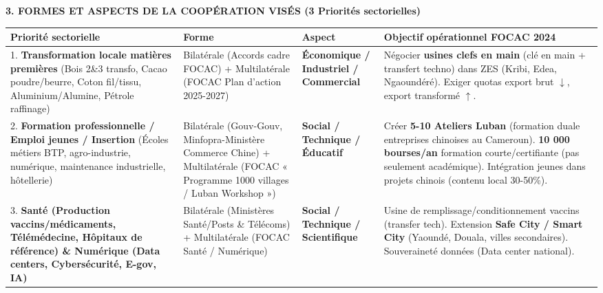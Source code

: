 \documentclass[11pt]{article}
\begin{document}
\begin{corrige}
\vspace{0.3cm}
\noindent\textbf{3. FORMES ET ASPECTS DE LA COOPÉRATION VISÉS (3 Priorités sectorielles)}

\begin{center}
\begin{tabularx}{\linewidth}{|l|X|X|X|}\hline
\textbf{Priorité sectorielle} & \textbf{Forme} & \textbf{Aspect} & \textbf{Objectif opérationnel FOCAC 2024} \\ \hline
1. \textbf{Transformation locale matières premières} (Bois 2\&3 transfo, Cacao poudre/beurre, Coton fil/tissu, Aluminium/Alumine, Pétrole raffinage) & Bilatérale (Accords cadre FOCAC) + Multilatérale (FOCAC Plan d'action 2025-2027) & \textbf{Économique / Industriel / Commercial} & Négocier \textbf{usines clefs en main} (clé en main + transfert techno) dans ZES (Kribi, Edea, Ngaoundéré). Exiger quotas export brut $\downarrow$, export transformé $\uparrow$. \\ \hline
2. \textbf{Formation professionnelle / Emploi jeunes / Insertion} (Écoles métiers BTP, agro-industrie, numérique, maintenance industrielle, hôtellerie) & Bilatérale (Gouv-Gouv, Minfopra-Ministère Commerce Chine) + Multilatérale (FOCAC « Programme 1000 villages / Luban Workshop ») & \textbf{Social / Technique / Éducatif} & Créer \textbf{5-10 Ateliers Luban} (formation duale entreprises chinoises au Cameroun). \textbf{10 000 bourses/an} formation courte/certifiante (pas seulement académique). Intégration jeunes dans projets chinois (contenu local 30-50\%). \\ \hline
3. \textbf{Santé (Production vaccins/médicaments, Télémédecine, Hôpitaux de référence) \& Numérique (Data centers, Cybersécurité, E-gov, IA)} & Bilatérale (Ministères Santé/Posts \& Télécoms) + Multilatérale (FOCAC Santé / Numérique) & \textbf{Social / Technique / Scientifique} & Usine de remplissage/conditionnement vaccins (transfer tech). Extension \textbf{Safe City / Smart City} (Yaoundé, Douala, villes secondaires). Souveraineté données (Data center national). \\ \hline
\end{tabularx}
\end{center}


\end{corrige}
\end{document}
